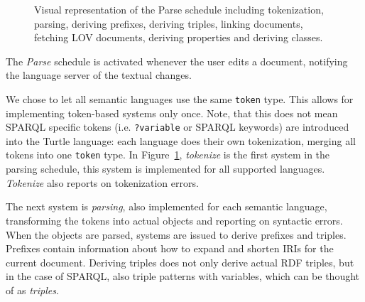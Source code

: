 \begin{figure}[tb]
 \centering
  \caption{Visual representation of the Parse schedule including tokenization, parsing, deriving prefixes, deriving triples, linking documents, fetching LOV documents, deriving properties and deriving classes. }\label{fig:Parse}
\end{figure}

The \textit{Parse} schedule %
is activated whenever the user edits a document, notifying the language server of the textual changes.

We chose to let all semantic languages use the same \texttt{token} type. 
This allows for implementing token-based systems only once.
Note, that this does not mean SPARQL specific tokens (i.e. \texttt{?variable} or SPARQL keywords) are introduced into the Turtle language:  each language does their own tokenization, merging all tokens into one \texttt{token} type.
In Figure~\ref{fig:Parse}, \textit{tokenize} is the first system in the parsing schedule, this system is implemented for all supported languages. \textit{Tokenize} also reports on tokenization errors.

The next system is \textit{parsing}, also implemented for each semantic language, transforming the tokens into actual objects and reporting on syntactic errors. 
When the objects are parsed, systems are issued to derive prefixes and triples. 
Prefixes contain information about how to expand and shorten IRIs for the current document.
Deriving triples does not only derive actual RDF triples, but in the case of SPARQL, also triple patterns with variables, which can be thought of as \textit{triples}.

